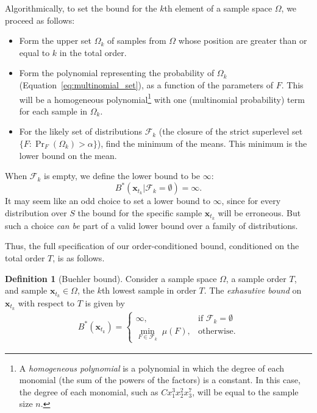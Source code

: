\documentclass{article}
\theoremstyle{definition}
\newtheorem{definition}{Definition}[section]
\theoremstyle{remark}
\def\x{\mathbf{x}}
\begin{document}
Algorithmically, to set the bound for the $k$th element of a sample space $\Omega$, we proceed as follows:
\begin{itemize}
    \item Form the upper set $\Omega_k$ of samples from $\Omega$ whose position are greater than or equal to $k$  in the total order.
  \item Form the polynomial representing the probability of   $\Omega_k$ (Equation~\ref{eq:multinomial_set}), as a function of the parameters of $F$. This will be a homogeneous polynomial\footnote{A {\em homogeneous polynomial} is a polynomial in which the degree of each monomial (the sum of the powers of the factors) is a constant. In this case, the degree of each monomial, such as $Cx_1^3x_2^2x_3^7$, will be equal to the sample size $n$.} with one (multinomial probability) term for each sample in $\Omega_k$. 
  \item For the likely set of distributions $\mathcal{F}_k$ (the closure of the strict superlevel set $\{F: \Pr_F(\Omega_k) > \alpha\}$), find the minimum of the means. This minimum is the lower bound on the mean. 
\end{itemize}

When $\mathcal{F}_k$ is empty, we define the lower bound to be $\infty$:
$$
B^*(\x_{t_k}| \mathcal{F}_k = \emptyset) = \infty.$$
It may seem like an odd choice to set a lower bound to $\infty$, since for every distribution over $S$ the bound for the specific sample $\x_{t_k}$ will be erroneous. But such a choice {\em can be} part of a valid lower bound over a family of distributions. %

Thus, the full specification of our order-conditioned bound, conditioned on the total order $T$, is as follows.
\begin{definition}[Buehler bound]
\label{def:cop}
    Consider a sample space $\Omega$, a sample order $T$, and sample $\x_{t_k} \in \Omega$, the $k$th lowest sample in order $T$. The \emph{exhasutive bound} on $\x_{t_k}$ with respect to $T$ is given by
    \begin{eqnarray}
    \label{eq:optBound}
    B^*(\x_{t_k}) =
    \begin{cases}
        \infty,& \text{if } \mathcal{F}_k=\emptyset \\
        \underset{F\in \mathcal{F}_k}{\min} \;\mu(F),              & \text{otherwise.}
    \end{cases}
    \end{eqnarray}
\end{definition}
\end{document}
